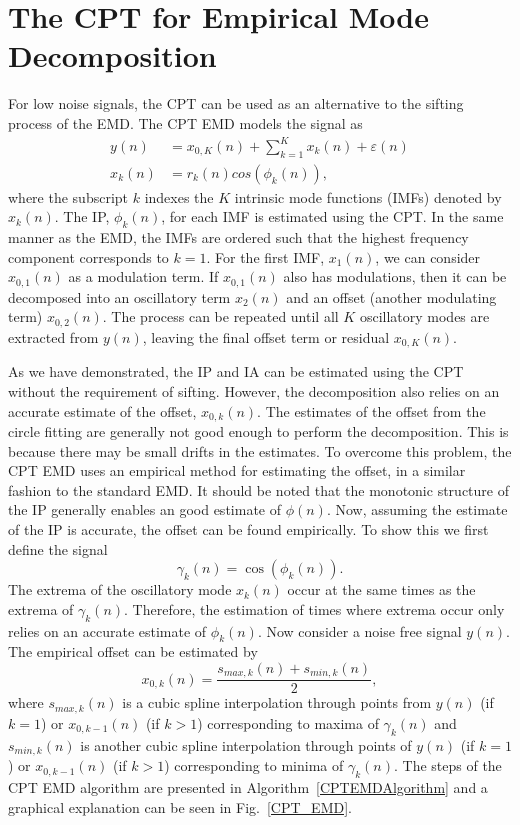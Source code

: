 \documentclass[a4paper]{IEEEtran}
\begin{document}
\section{The CPT for Empirical Mode Decomposition}\label{sect:CPTEMDSection}
For low noise signals, the CPT can be used as an alternative to the sifting process of the EMD. The CPT EMD models the signal as
\begin{align}
    y(n) &= x_{0,K}(n) + \sum_{k=1}^{K}x_k(n) + \varepsilon(n) \\
    x_k\left(n\right) &= r_k\left(n\right)cos\left(\phi_k\left(n\right)\right),
\end{align}
where the subscript $k$ indexes the $K$ intrinsic mode functions (IMFs) denoted by $x_k(n)$. The IP, $\phi_k(n)$, for each IMF is estimated using the CPT. In the same manner as the EMD, the IMFs are ordered such that the highest frequency component corresponds to $k=1$. For the first IMF, $x_1(n)$, we can consider $x_{0,1}(n)$ as a modulation term. If $x_{0,1}(n)$ also has modulations, then it can be decomposed into an oscillatory term $x_2(n)$ and an offset (another modulating term) $x_{0,2}(n)$. The process can be repeated until all $K$ oscillatory modes are extracted from $y(n)$, leaving the final offset term or residual $x_{0,K}(n)$.

As we have demonstrated, the IP and IA can be estimated using the CPT without the requirement of sifting. However, the decomposition also relies on an accurate estimate of the offset, $x_{0,k}(n)$. The estimates of the offset from the circle fitting are generally not good enough to perform the decomposition. This is because there may be small drifts in the estimates. To overcome this problem, the CPT EMD uses an empirical method for estimating the offset, in a similar fashion to the standard EMD. It should be noted that the monotonic structure of the IP generally enables an good estimate of $\phi(n)$. Now, assuming the estimate of the IP is accurate, the offset can be found empirically. To show this we first define the signal
\begin{equation}
	\gamma_k(n)=\cos(\phi_k(n)).
\end{equation}   
The extrema of the oscillatory mode $x_k(n)$ occur at the same times as the extrema of $\gamma_k(n)$. Therefore, the estimation of times where extrema occur only relies on an accurate estimate of $\phi_k(n)$. Now consider a noise free signal $y(n)$. The empirical offset can be estimated by 
\begin{equation}
    x_{0,k}(n) = \frac{s_{max,k}(n) + s_{min,k}(n)}{2},
\end{equation}
where $s_{max,k}(n)$ is a cubic spline interpolation through points from $y(n)$ (if $k=1$) or $x_{0,k-1}(n)$ (if $k>1$) corresponding to maxima of $\gamma_k(n)$ and $s_{min,k}(n)$ is another cubic spline interpolation through points of $y(n)$ (if $k=1$) or $x_{0,k-1}(n)$ (if $k>1$) corresponding to minima of $\gamma_k(n)$. The steps of the CPT EMD algorithm are presented in Algorithm~\ref{CPTEMDAlgorithm} and a graphical explanation can be seen in Fig.~\ref{CPT_EMD}.
\end{document}
